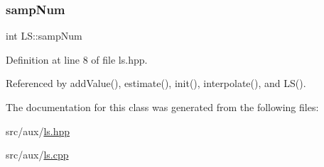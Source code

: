 \mbox{\label{class_l_s_a333c6e0be784cffd2f97f46803c5ba15}} 
\subsubsection{\texorpdfstring{samp\+Num}{sampNum}}
{\footnotesize\ttfamily int L\+S\+::samp\+Num\hspace{0.3cm}{\ttfamily [private]}}



Definition at line 8 of file ls.\+hpp.



Referenced by add\+Value(), estimate(), init(), interpolate(), and L\+S().



The documentation for this class was generated from the following files\+:\begin{DoxyCompactItemize}
\item 
src/aux/\hyperlink{ls_8hpp}{ls.\+hpp}\item 
src/aux/\hyperlink{ls_8cpp}{ls.\+cpp}\end{DoxyCompactItemize}
